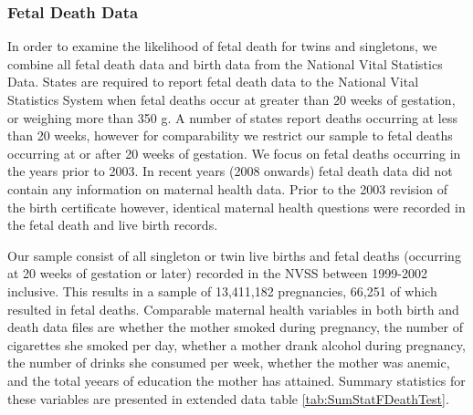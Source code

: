 \documentclass{nature}
\begin{document}
\begin{linenumbers}
\subsubsection{Fetal Death Data}
In order to examine the likelihood of fetal death for twins and singletons, we combine all fetal death data and birth data from the National Vital Statistics Data.   States are required to report fetal death data to the National Vital Statistics System when fetal deaths occur at greater than 20 weeks of gestation, or weighing more than 350 g. A number of states report deaths occurring at less than 20 weeks, however for comparability we restrict our sample to fetal deaths occurring at or after 20 weeks of gestation.  We focus on fetal deaths occurring in the years prior to 2003.  In recent years (2008 onwards) fetal death data did not contain any information on maternal health data.  Prior to the 2003 revision of the birth certificate however, identical maternal health questions were recorded in the fetal death and live birth records.

Our sample consist of all singleton or twin live births and fetal deaths (occurring at 20 weeks of gestation or later) recorded in the NVSS between 1999-2002 inclusive.  This results in a sample of 13,411,182 pregnancies, 66,251 of which resulted in fetal deaths.  Comparable maternal health variables in both birth and death data files are whether the mother smoked during pregnancy, the number of cigarettes she smoked per day, whether a mother drank alcohol during pregnancy, the number of drinks she consumed per week, whether the mother was anemic, and the total yeears of education the mother has attained.  Summary statistics for these variables are presented in extended data table \ref{tab:SumStatFDeathTest}.


\end{linenumbers}
\end{document}
